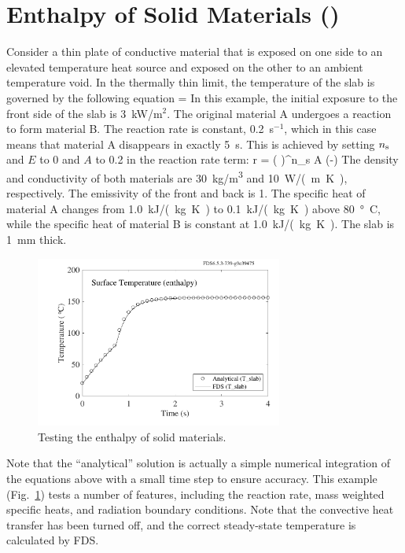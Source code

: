 \documentclass[11pt]{book}
\begin{document}
\section{Enthalpy of Solid Materials (\texorpdfstring{}{enthalpy})}
\label{enthalpy}

Consider a thin plate of conductive material that is exposed on one side to an elevated temperature heat source and exposed on the other to an ambient temperature void. In the thermally thin limit, the temperature of the slab is governed by the following equation
\be
    = 
\ee
In this example, the initial exposure to the front side of the slab is 3~kW/m$^2$. The original material A undergoes a reaction to form material B.  The reaction rate is constant, 0.2~s$^{-1}$, which in this case means that material A disappears in exactly 5~s. This is achieved by setting $n_{\rm s}$ and $E$ to 0 and $A$ to 0.2 in the reaction rate term:
\be
    r = \left( \right)^{n_{s}}
    A \; \exp \left(-\right)
\ee
The density and conductivity of both materials are 30~\si{kg/m^3} and 10~\si{W/(m.K)}, respectively. The emissivity of the front and back is 1.  The specific heat of material A changes from 1.0~\si{kJ/(kg.K)} to 0.1~\si{kJ/(kg.K)} above 80~\si{\degree C}, while the specific heat of material B is constant at 1.0~\si{kJ/(kg.K)}. The slab is 1~mm thick.
\begin{figure}[!htb]
\centering
\includegraphics[width=3.2in]{SCRIPT_FIGURES/enthalpy}
\caption[The  test case]{Testing the enthalpy of solid materials.}
\label{fig:solid_phase_enthalpy}
\end{figure}
Note that the ``analytical'' solution is actually a simple numerical integration of the equations above with a small time step to ensure accuracy.
This example (Fig.~\ref{fig:solid_phase_enthalpy}) tests a number of features, including the reaction rate, mass weighted specific heats, and radiation boundary conditions. Note that the
convective heat transfer has been turned off, and the correct steady-state temperature is calculated by FDS.
\end{document}
